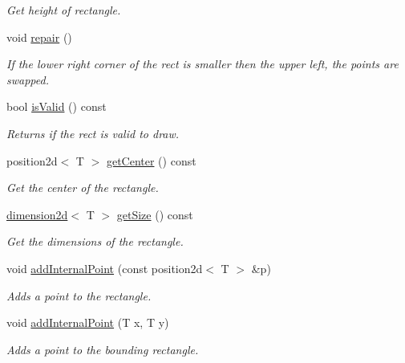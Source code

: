 \begin{DoxyCompactItemize}
\begin{DoxyCompactList}\small\item\em Get height of rectangle. \end{DoxyCompactList}\item 
void \hyperlink{classirr_1_1core_1_1rect_a45c7665e74aed626bb5c01729f206775}{repair} ()\hypertarget{classirr_1_1core_1_1rect_a45c7665e74aed626bb5c01729f206775}{}\label{classirr_1_1core_1_1rect_a45c7665e74aed626bb5c01729f206775}

\begin{DoxyCompactList}\small\item\em If the lower right corner of the rect is smaller then the upper left, the points are swapped. \end{DoxyCompactList}\item 
bool \hyperlink{classirr_1_1core_1_1rect_a1ab043c2f686a7d02fc72a1655162faf}{is\+Valid} () const 
\begin{DoxyCompactList}\small\item\em Returns if the rect is valid to draw. \end{DoxyCompactList}\item 
position2d$<$ T $>$ \hyperlink{classirr_1_1core_1_1rect_a44fa44c31767208d5bf2b6e6980a742c}{get\+Center} () const \hypertarget{classirr_1_1core_1_1rect_a44fa44c31767208d5bf2b6e6980a742c}{}\label{classirr_1_1core_1_1rect_a44fa44c31767208d5bf2b6e6980a742c}

\begin{DoxyCompactList}\small\item\em Get the center of the rectangle. \end{DoxyCompactList}\item 
\hyperlink{classirr_1_1core_1_1dimension2d}{dimension2d}$<$ T $>$ \hyperlink{classirr_1_1core_1_1rect_adffacbb0f07d8268a32af2a32b3ac3ac}{get\+Size} () const \hypertarget{classirr_1_1core_1_1rect_adffacbb0f07d8268a32af2a32b3ac3ac}{}\label{classirr_1_1core_1_1rect_adffacbb0f07d8268a32af2a32b3ac3ac}

\begin{DoxyCompactList}\small\item\em Get the dimensions of the rectangle. \end{DoxyCompactList}\item 
void \hyperlink{classirr_1_1core_1_1rect_a0b7496319a32ceda640c730f5822f1ef}{add\+Internal\+Point} (const position2d$<$ T $>$ \&p)
\begin{DoxyCompactList}\small\item\em Adds a point to the rectangle. \end{DoxyCompactList}\item 
void \hyperlink{classirr_1_1core_1_1rect_a25b80222bc003a238fa8f5157bdb8b9d}{add\+Internal\+Point} (T x, T y)
\begin{DoxyCompactList}\small\item\em Adds a point to the bounding rectangle. \end{DoxyCompactList}\end{DoxyCompactItemize}
